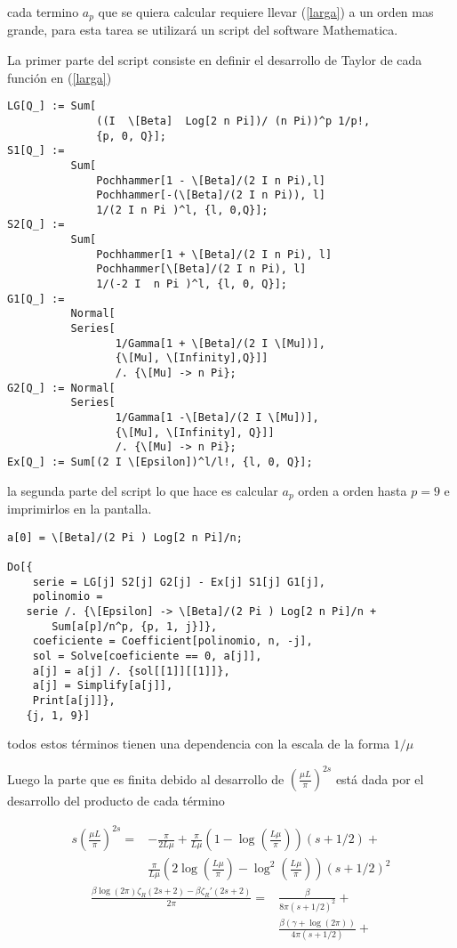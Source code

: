 cada termino $a_p$ que se quiera calcular requiere llevar (\ref{larga}) a un orden mas grande, para esta tarea se utilizará un script del software Mathematica.


La primer parte del script consiste en definir el desarrollo de Taylor de cada función  en (\ref{larga})
\begin{verbatim}
LG[Q_] := Sum[
              ((I  \[Beta]  Log[2 n Pi])/ (n Pi))^p 1/p!, 
              {p, 0, Q}];
S1[Q_] := 
          Sum[
              Pochhammer[1 - \[Beta]/(2 I n Pi),l] 
              Pochhammer[-(\[Beta]/(2 I n Pi)), l] 
              1/(2 I n Pi )^l, {l, 0,Q}];
S2[Q_] := 
          Sum[
              Pochhammer[1 + \[Beta]/(2 I n Pi), l] 
              Pochhammer[\[Beta]/(2 I n Pi), l] 
              1/(-2 I  n Pi )^l, {l, 0, Q}];
G1[Q_] := 
          Normal[
          Series[
                 1/Gamma[1 + \[Beta]/(2 I \[Mu])], 
                 {\[Mu], \[Infinity],Q}]] 
                 /. {\[Mu] -> n Pi};
G2[Q_] := Normal[
          Series[
                 1/Gamma[1 -\[Beta]/(2 I \[Mu])], 
                 {\[Mu], \[Infinity], Q}]] 
                 /. {\[Mu] -> n Pi};
Ex[Q_] := Sum[(2 I \[Epsilon])^l/l!, {l, 0, Q}];
\end{verbatim}
la segunda parte del script lo que hace es calcular $a_p$ orden a orden hasta $p=9$ e imprimirlos en la pantalla.

\begin{verbatim}
a[0] = \[Beta]/(2 Pi ) Log[2 n Pi]/n;

Do[{
  	serie = LG[j] S2[j] G2[j] - Ex[j] S1[j] G1[j],
  	polinomio = 
   serie /. {\[Epsilon] -> \[Beta]/(2 Pi ) Log[2 n Pi]/n + 
       Sum[a[p]/n^p, {p, 1, j}]},
  	coeficiente = Coefficient[polinomio, n, -j],
  	sol = Solve[coeficiente == 0, a[j]],
  	a[j] = a[j] /. {sol[[1]][[1]]},
  	a[j] = Simplify[a[j]],
  	Print[a[j]]},
   {j, 1, 9}]
\end{verbatim}




todos estos términos tienen una dependencia con la escala de la forma $1/ \mu$

Luego la parte que es finita debido al desarrollo de $ \left( \frac{\mu L}{\pi}\right) ^{2s}$ está dada por el desarrollo del producto de cada término

\begin{align}
s \left( \frac{\mu L}{\pi} \right) ^{2s}  = &
										- \frac{\pi}{2 L \mu} +
										\frac{ \pi }{L \mu } \left( 1 - \log \left( \frac{L \mu }{\pi } \right) \right) (s+1/2)  + 
										\nonumber \\
										& \frac{ \pi}{L \mu} \left( 2 \log \left( \frac{L \mu}{\pi}\right)- 
										  \log ^2 \left( \frac{L \mu}{\pi} \right) \right) (s+1/2) ^2 
\end{align}
\begin{align}
\frac{\beta \log (2 \pi) \zeta _R (2s+2) - \beta \zeta _R ' (2s+2)}{2 \pi } =  
				& \frac{\beta}{8 \pi (s+1/2) ^2} + \nonumber \\
				& \frac{\beta ( \gamma + \log (2 \pi ) )}{4 \pi (s+1/2)} + 
\end{align}


